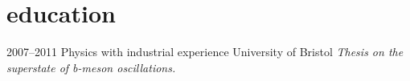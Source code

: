 \documentclass[]{friggeri-cv} %
\begin{document}

\section{education}

\begin{entrylist}
\entry
{2007--2011}
{Physics {\normalfont with industrial experience}}
{University of Bristol}
{\emph{Thesis on the superstate of b-meson oscillations.} }
\end{entrylist}




\end{document}
